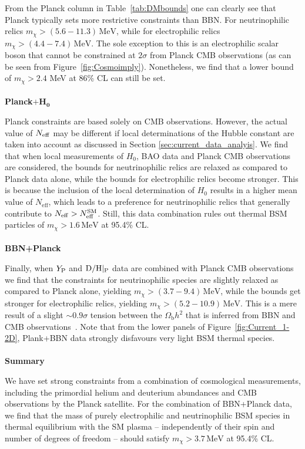 \documentclass[notitlepage,letterpaper,natbib,aps,prd,onecolumn,amsmath,amsfonts,nofootinbib,preprintnumbers,superscriptaddress,secnumarabic,groupedaddress]{revtex4-1}
\begin{document}
From the Planck column in Table~\ref{tab:DMbounds} one can clearly see that Planck typically sets more restrictive constraints than BBN. For neutrinophilic relics $m_\chi > (5.6-11.3)\,\text{MeV}$, while for electrophilic relics $m_\chi > (4.4-7.4)\,\text{MeV}$. The sole exception to this is an electrophilic scalar boson that cannot be constrained at $2\sigma$ from Planck CMB observations (as can be seen from Figure~\ref{fig:Cosmoimply}). Nonetheless, we find that a lower bound of $m_\chi > 2.4$ MeV at 86\% CL can still be set.\\\\
\textbf{Planck}$\boldsymbol{+H_0}$


Planck constraints are based solely on CMB observations. However, the actual value of $N_{\rm eff}$ may be different if local determinations of the Hubble constant are taken into account as discussed in Section \ref{sec:current_data_analyis}. We find that when local measurements of $H_0$, BAO data and Planck CMB observations are considered, the bounds for neutrinophilic relics are relaxed as compared to Planck data alone, while the bounds for electrophilic relics become stronger. This is because the inclusion of the local determination of $H_0$ results in a higher mean value of $N_\mathrm{eff}$, which leads to a preference for neutrinophilic relics that generally contribute to $N_\mathrm{eff} >N_\mathrm{eff}^{\rm SM}$. Still, this data combination rules out thermal BSM particles of $m_\chi > 1.6\,\text{MeV}$ at 95.4\% CL.\\\\
\textbf{BBN+Planck}

Finally, when $Y_{\rm P}$ and  ${\rm D/H}|_{\rm P}$ data are combined with Planck CMB observations we find that the constraints for neutrinophilic species are slightly relaxed as compared to Planck alone, yielding $m_\chi > (3.7-9.4)\,\text{MeV}$, while the bounds get stronger for electrophilic relics, yielding $m_\chi > (5.2-10.9)\,\text{MeV}$. This is a mere result of a slight $\sim 0.9\sigma $ tension between the $\Omega_\mathrm{b}h^2$ that is inferred from BBN and CMB observations~\cite{Pitrou:2018cgg}. Note that from the lower panels of Figure~\ref{fig:Current_1-2D}, Plank+BBN data strongly disfavours very light BSM thermal species. \\\\
\textbf{Summary} 


We have set strong constraints from a combination of cosmological measurements, including the primordial helium and deuterium abundances and CMB observations by the Planck satellite. For the combination of BBN+Planck data, we find that the mass of purely electrophilic and neutrinophilic BSM species in thermal equilibrium with the SM plasma -- independently of their spin and number of degrees of freedom -- should satisfy $m_\chi > 3.7\,\text{MeV}$ at 95.4\% CL. 
\end{document}
